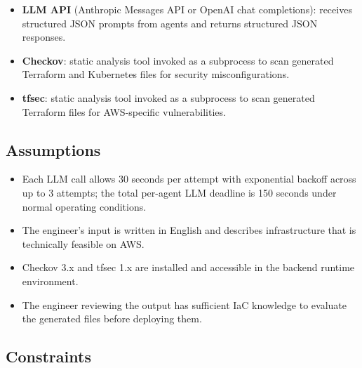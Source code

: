 \begin{itemize}
  \item \textbf{LLM API} (Anthropic Messages API or OpenAI chat completions):
    receives structured JSON prompts from agents and returns structured JSON
    responses.
  \item \textbf{Checkov}: static analysis tool invoked as a subprocess to
    scan generated Terraform and Kubernetes files for security
    misconfigurations.
  \item \textbf{tfsec}: static analysis tool invoked as a subprocess to
    scan generated Terraform files for AWS-specific vulnerabilities.
\end{itemize}

\subsection*{Assumptions}

\begin{itemize}
  \item Each LLM call allows 30 seconds per attempt with exponential backoff
    across up to 3 attempts; the total per-agent LLM deadline is 150 seconds
    under normal operating conditions.
  \item The engineer's input is written in English and describes
    infrastructure that is technically feasible on AWS.
  \item Checkov 3.x and tfsec 1.x are installed and accessible in the
    backend runtime environment.
  \item The engineer reviewing the output has sufficient IaC knowledge to
    evaluate the generated files before deploying them.
\end{itemize}

\subsection*{Constraints}

